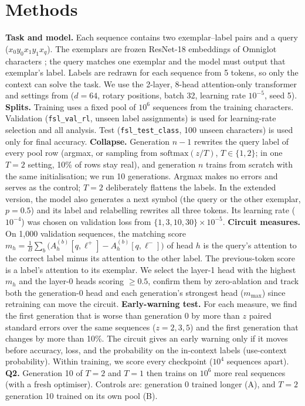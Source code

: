 \documentclass[10pt,letterpaper]{article}
\begin{document}
\section{Methods}
\textbf{Task and model.} Each sequence contains two exemplar--label pairs and a query
($x_0y_0x_1y_1x_q$). The exemplars are frozen ResNet-18 embeddings of Omniglot characters
\citep{lake2015omniglot}; the query matches one exemplar and the model must output that exemplar's label. Labels are redrawn for each sequence from 5 tokens, so only the context can solve the task. We use the 2-layer, 8-head attention-only transformer and settings from \citet{singh2024needs} ($d{=}64$, rotary positions, batch 32, learning rate $10^{-5}$, seed 5). \textbf{Splits.} Training uses a fixed pool of $10^6$ sequences from the training characters. Validation (\texttt{fsl\_val\_rl}, unseen label assignments) is used for learning-rate selection and all analysis. Test (\texttt{fsl\_test\_class}, 100 unseen characters) is used only for final accuracy.
\textbf{Collapse.} Generation $n{-}1$ rewrites the query label of every pool row (argmax, or sampling from $\mathrm{softmax}(z/T)$, $T\in\{1,2\}$; in one $T{=}2$ setting, 10\% of rows stay real), and generation $n$ trains from scratch with the same initialisation; we run 10 generations. Argmax makes no errors and serves as the control; $T{=}2$ deliberately flattens the labels. In the extended version, the model also generates a next symbol (the query or the other exemplar, $p{=}0.5$) and its label and relabelling rewrites all three tokens. Its learning rate ($10^{-4}$) was chosen on validation loss from $\{1,3,10,30\}\times10^{-5}$.
\textbf{Circuit measures.} On 1,000 validation sequences, the matching score
$m_h=\frac{1}{B}\sum_b\big(A_h^{(b)}[q,\ell^{+}]-A_h^{(b)}[q,\ell^{-}]\big)$ of head $h$ is the query's attention to the correct label minus its attention to the other label. The previous-token score is a label's attention to its exemplar. We select the layer-1 head with the highest $m_h$ and the layer-0 heads scoring ${\geq}0.5$, confirm them by zero-ablation and track both the generation-0 head and each generation's strongest head ($m_{\max}$) since retraining can move the circuit.
\textbf{Early-warning test.} For each measure, we find the first generation that is worse than generation 0 by more than $z$ paired standard errors over the same sequences ($z{=}2,3,5$) and the first generation that changes by more than 10\%. The circuit gives an early warning only if it moves before accuracy, loss, and the probability on the in-context labels (use-context probability). Within training, we score every checkpoint ($10^4$ sequences apart).
\textbf{Q2.} Generation 10 of $T{=}2$ and $T{=}1$ then trains on $10^6$ more real sequences (with a fresh optimiser). Controls are: generation 0 trained longer (A), and $T{=}2$ generation 10 trained on its own pool (B).
\end{document}
